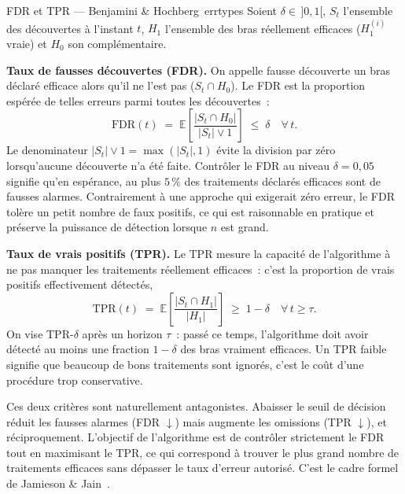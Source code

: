 \documentclass[10.5pt,a4paper]{article}
\newcommand{\E}{\mathbb{E}}
\newcommand{\Hnull}{H_0}
\newcommand{\Halt}{H_1}
\begin{document}
\begin{definition}{FDR et TPR --- Benjamini \& Hochberg~\cite{benjamini1995}}{errtypes}
Soient $\delta \in\,]0,1[$, $S_t$ l'ensemble des d\'ecouvertes \`a
l'instant $t$, $\Halt$ l'ensemble des bras r\'eellement efficaces
($H_1^{(i)}$ vraie) et $\Hnull$ son compl\'ementaire.

\medskip
\textbf{Taux de fausses d\'ecouvertes (FDR).}
On appelle fausse d\'ecouverte un bras d\'eclar\'e efficace alors
qu'il ne l'est pas ($S_t \cap \Hnull$). Le FDR est la proportion
esp\'er\'ee de telles erreurs parmi toutes les d\'ecouvertes~:
\[
  \mathrm{FDR}(t) \;=\;
  \E\!\left[\frac{|S_t \cap \Hnull|}{|S_t|\vee 1}\right] \;\leq\; \delta
  \quad \forall\,t.
\]
Le denominateur $|S_t| \vee 1 = \max(|S_t|, 1)$ \'evite la division par
z\'ero lorsqu'aucune d\'ecouverte n'a \'et\'e faite. Contr\^oler le FDR
au niveau $\delta = 0{,}05$ signifie qu'en esp\'erance, au plus $5\,\%$
des traitements d\'eclar\'es efficaces sont de fausses alarmes. Contrairement
\`a une approche qui exigerait z\'ero erreur, le FDR tol\`ere un petit
nombre de faux positifs, ce qui est raisonnable en pratique et pr\'eserve
la puissance de d\'etection lorsque $n$ est grand.

\medskip
\textbf{Taux de vrais positifs (TPR).}
Le TPR mesure la capacit\'e de l'algorithme \`a ne pas manquer les
traitements r\'eellement efficaces~: c'est la proportion de vrais
positifs effectivement d\'etect\'es,
\[
  \mathrm{TPR}(t) \;=\;
  \E\!\left[\frac{|S_t \cap \Halt|}{|\Halt|}\right] \;\geq\; 1-\delta
  \quad \forall\,t \geq \tau.
\]
On vise TPR-$\delta$ apr\`es un horizon $\tau$~: pass\'e ce temps,
l'algorithme doit avoir d\'etect\'e au moins une fraction $1-\delta$ des
bras vraiment efficaces. Un TPR faible signifie que beaucoup de bons
traitements sont ignor\'es, c'est le co\^ut d'une proc\'edure trop
conservative.
\end{definition}

\begin{keyidea}
Ces deux crit\`eres sont naturellement antagonistes. Abaisser le seuil
de d\'ecision r\'eduit les fausses alarmes (FDR $\downarrow$) mais
augmente les omissions (TPR $\downarrow$), et r\'eciproquement.
L'objectif de l'algorithme est de contr\^oler strictement le FDR tout
en maximisant le TPR, ce qui correspond \`a trouver le plus grand nombre
de traitements efficaces sans d\'epasser le taux d'erreur autoris\'e.
C'est le cadre formel de Jamieson \& Jain~\cite{jamieson2019}.
\end{keyidea}
\end{document}
